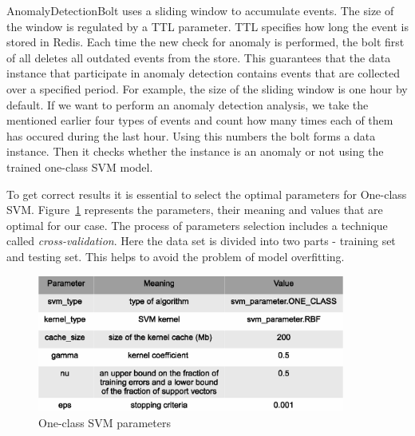AnomalyDetectionBolt uses a sliding window to accumulate events.
The size of the window is regulated by a TTL parameter.
TTL specifies how long the event is stored in Redis.
Each time the new check for anomaly is performed, the bolt first of all deletes all outdated events from the store.
This guarantees that the data instance that participate in anomaly detection contains events that are collected over a specified period.
For example, the size of the sliding window is one hour by default.
If we want to perform an anomaly detection analysis, we take the mentioned earlier four types of events and count how many times each of them has occured during the last hour.
Using this numbers the bolt forms a data instance.  
Then it checks whether the instance is an anomaly or not using the trained one-class SVM model.

To get correct results it is essential to select the optimal parameters for One-class SVM.
Figure~\ref{fig:svm_parameters} represents the parameters, their meaning and values that are optimal for our case.
The process of parameters selection includes a technique called \textit{cross-validation}.
Here the data set is divided into two parts - training set and testing set.
This helps to avoid the problem of model overfitting.  

\begin{figure}[h]
  \centering
  \includegraphics [width=0.9\textwidth]{images/svm_parameters}
  \caption{One-class SVM parameters}
  \label{fig:svm_parameters}
\end{figure}







 	

 
 
